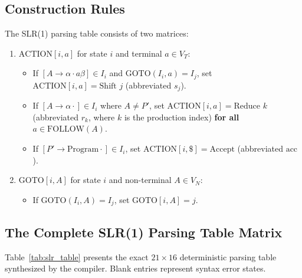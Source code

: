 \documentclass[11pt,a4paper]{article}
\begin{document}
\subsection{Construction Rules}
The SLR(1) parsing table consists of two matrices:
\begin{enumerate}
    \item $\text{ACTION}[i, a]$ for state $i$ and terminal $a \in V_T$:
    \begin{itemize}
        \item If $[A \to \alpha \cdot a \beta] \in I_i$ and $\text{GOTO}(I_i, a) = I_j$, set $\text{ACTION}[i, a] = \text{Shift } j$ (abbreviated $s_j$).
        \item If $[A \to \alpha \cdot] \in I_i$ where $A \neq P'$, set $\text{ACTION}[i, a] = \text{Reduce } k$ (abbreviated $r_k$, where $k$ is the production index) \textbf{for all $a \in \text{FOLLOW}(A)$}.
        \item If $[P' \to \text{Program} \cdot] \in I_i$, set $\text{ACTION}[i, \$] = \text{Accept}$ (abbreviated $\text{acc}$).
    \end{itemize}
    \item $\text{GOTO}[i, A]$ for state $i$ and non-terminal $A \in V_N$:
    \begin{itemize}
        \item If $\text{GOTO}(I_i, A) = I_j$, set $\text{GOTO}[i, A] = j$.
    \end{itemize}
\end{enumerate}

\subsection{The Complete SLR(1) Parsing Table Matrix}
Table~\ref{tab:slr_table} presents the exact $21 \times 16$ deterministic parsing table synthesized by the compiler. Blank entries represent syntax error states.
\end{document}
